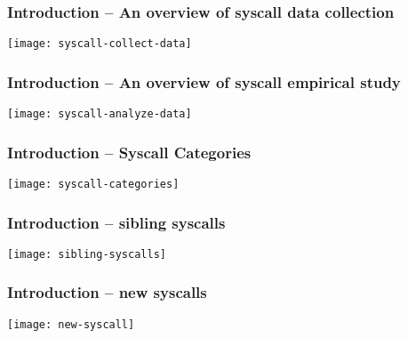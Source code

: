 \begin{frame}[plain]
	\frametitle{Introduction -- An overview of syscall data collection}
	
	
	
	\centering
	\texttt{[image: syscall-collect-data]}
	
	
	
\end{frame}


\begin{frame}[plain]
	\frametitle{Introduction -- An overview of syscall empirical study}
	
	
	
	\centering
	\texttt{[image: syscall-analyze-data]}
	
	
	
\end{frame}



\begin{frame}[plain]
	\frametitle{Introduction -- Syscall Categories}
	
	
	
	\centering
	\texttt{[image: syscall-categories]}
	
	
	
\end{frame}


\begin{frame}[plain]
	\frametitle{Introduction -- sibling syscalls}
	
	
	
	\centering
	\texttt{[image: sibling-syscalls]}
	
	
	
\end{frame}


\begin{frame}[plain]
	\frametitle{Introduction -- new syscalls}
	
	
	
	\centering
	\texttt{[image: new-syscall]}
	
	
	
\end{frame}


